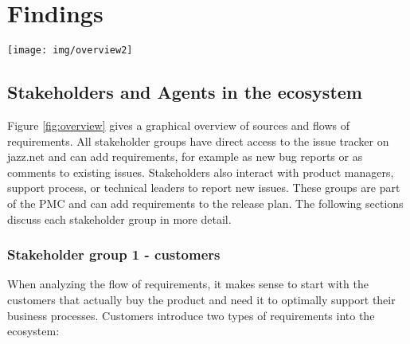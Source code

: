 \section{Findings}
\label{sec:findings}

\begin{figure*}[t]
\begin{center}
\texttt{[image: img/overview2]}
\caption{Overview: Requirements flows in RTC.}
\label{fig:overview}
\end{center}
\end{figure*}


\subsection{Stakeholders and Agents in the ecosystem}
Figure \ref{fig:overview} gives a graphical overview of sources and flows of requirements.
All stakeholder groups have direct access to the issue tracker on jazz.net and can add requirements, for example as new bug reports or as comments to existing issues.
Stakeholders also interact with product managers, support process, or technical leaders to report new issues. 
These groups are part of the PMC and can add requirements to the release plan.
The following sections discuss each stakeholder group in more detail.

\subsubsection{Stakeholder group 1 - customers}

When analyzing the flow of requirements, it makes sense to start with the customers that actually buy the product and need it to optimally support their business processes. 
Customers introduce two types of requirements into the ecosystem:

